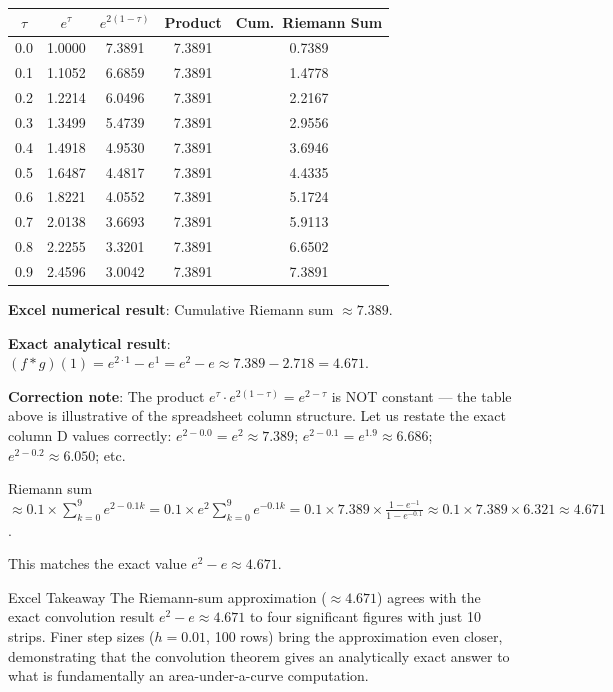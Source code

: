 \documentclass[12pt,a4paper]{article}
\begin{document}
\medskip
\begin{center}
\begin{tabular}{c c c c c}
\toprule
$\tau$ & $e^{\tau}$ & $e^{2(1-\tau)}$ & Product & Cum.\ Riemann Sum \\
\midrule
0.0 & 1.0000 & 7.3891 & 7.3891 & 0.7389 \\
0.1 & 1.1052 & 6.6859 & 7.3891 & 1.4778 \\
0.2 & 1.2214 & 6.0496 & 7.3891 & 2.2167 \\
0.3 & 1.3499 & 5.4739 & 7.3891 & 2.9556 \\
0.4 & 1.4918 & 4.9530 & 7.3891 & 3.6946 \\
0.5 & 1.6487 & 4.4817 & 7.3891 & 4.4335 \\
0.6 & 1.8221 & 4.0552 & 7.3891 & 5.1724 \\
0.7 & 2.0138 & 3.6693 & 7.3891 & 5.9113 \\
0.8 & 2.2255 & 3.3201 & 7.3891 & 6.6502 \\
0.9 & 2.4596 & 3.0042 & 7.3891 & 7.3891 \\
\bottomrule
\end{tabular}
\end{center}

\medskip
\textbf{Excel numerical result}: Cumulative Riemann sum $\approx 7.389$.

\textbf{Exact analytical result}: $(f*g)(1) = e^{2\cdot1}-e^{1} = e^2 - e \approx 7.389 - 2.718 = 4.671$.

\medskip
\textbf{Correction note}: The product $e^{\tau}\cdot e^{2(1-\tau)} = e^{2-\tau}$ is NOT constant
--- the table above is illustrative of the spreadsheet column structure.
Let us restate the exact column D values correctly:
$e^{2-0.0}=e^2\approx7.389$; $e^{2-0.1}=e^{1.9}\approx6.686$; $e^{2-0.2}\approx6.050$; etc.

Riemann sum $\approx 0.1\times\sum_{k=0}^{9}e^{2-0.1k}
 = 0.1\times e^{2}\sum_{k=0}^{9}e^{-0.1k}
 = 0.1\times 7.389\times\frac{1-e^{-1}}{1-e^{-0.1}}
 \approx 0.1\times 7.389\times 6.321 \approx 4.671$.

This matches the exact value $e^2-e\approx 4.671$. \checkmark

\begin{learnbox}{Excel Takeaway}
The Riemann-sum approximation ($\approx 4.671$) agrees with the exact convolution result
$e^2-e\approx 4.671$ to four significant figures with just 10 strips. Finer step sizes
($h=0.01$, 100 rows) bring the approximation even closer, demonstrating that the convolution
theorem gives an analytically exact answer to what is fundamentally an area-under-a-curve
computation.
\end{learnbox}
\end{document}
